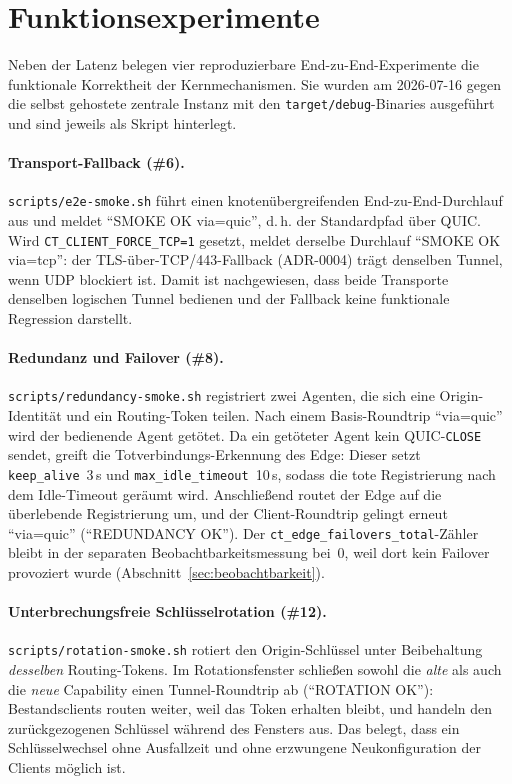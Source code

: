 \section{Funktionsexperimente}
\label{sec:funktionsexperimente}

Neben der Latenz belegen vier reproduzierbare End-zu-End-Experimente die
funktionale Korrektheit der Kernmechanismen. Sie wurden am 2026-07-16 gegen die
selbst gehostete zentrale Instanz mit den \texttt{target/debug}-Binaries
ausgeführt und sind jeweils als Skript hinterlegt.

\paragraph{Transport-Fallback (\#6).} \texttt{scripts/e2e-smoke.sh} führt einen
knotenübergreifenden End-zu-End-Durchlauf aus und meldet
\enquote{SMOKE OK via=quic}, d.\,h. der Standardpfad über QUIC. Wird
\texttt{CT\_CLIENT\_FORCE\_TCP=1} gesetzt, meldet derselbe Durchlauf
\enquote{SMOKE OK via=tcp}: der TLS-über-TCP/443-Fallback (ADR-0004) trägt
denselben Tunnel, wenn UDP blockiert ist. Damit ist nachgewiesen, dass beide
Transporte denselben logischen Tunnel bedienen und der Fallback keine
funktionale Regression darstellt.

\paragraph{Redundanz und Failover (\#8).} \texttt{scripts/redundancy-smoke.sh}
registriert zwei Agenten, die sich eine Origin-Identität und ein Routing-Token
teilen. Nach einem Basis-Roundtrip \enquote{via=quic} wird der bedienende Agent
getötet. Da ein getöteter Agent kein QUIC-\texttt{CLOSE} sendet, greift die
Totverbindungs-Erkennung des Edge: Dieser setzt \texttt{keep\_alive}~3\,s und
\texttt{max\_idle\_timeout}~10\,s, sodass die tote Registrierung nach dem
Idle-Timeout geräumt wird. Anschließend routet der Edge auf die überlebende
Registrierung um, und der Client-Roundtrip gelingt erneut \enquote{via=quic}
(\enquote{REDUNDANCY OK}). Der \texttt{ct\_edge\_failovers\_total}-Zähler bleibt
in der separaten Beobachtbarkeitsmessung bei~0, weil dort kein Failover
provoziert wurde (Abschnitt~\ref{sec:beobachtbarkeit}).

\paragraph{Unterbrechungsfreie Schlüsselrotation (\#12).}
\texttt{scripts/rotation-smoke.sh} rotiert den Origin-Schlüssel unter Beibehaltung
\emph{desselben} Routing-Tokens. Im Rotationsfenster schließen sowohl die
\emph{alte} als auch die \emph{neue} Capability einen Tunnel-Roundtrip ab
(\enquote{ROTATION OK}): Bestandsclients routen weiter, weil das Token erhalten
bleibt, und handeln den zurückgezogenen Schlüssel während des Fensters aus. Das
belegt, dass ein Schlüsselwechsel ohne Ausfallzeit und ohne erzwungene
Neukonfiguration der Clients möglich ist.


